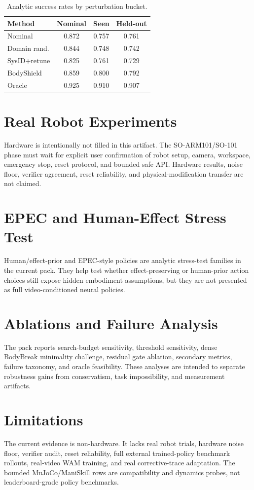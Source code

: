 \documentclass[10pt,conference]{IEEEtran}
\begin{document}
\begin{table}[t]
\caption{Analytic success rates by perturbation bucket.}
\label{tab:analytic-success}
\centering
\footnotesize
\begin{tabular}{lccc}
\toprule
Method & Nominal & Seen & Held-out \\
\midrule
Nominal & 0.872 & 0.757 & 0.761 \\
Domain rand. & 0.844 & 0.748 & 0.742 \\
SysID+retune & 0.825 & 0.761 & 0.729 \\
BodyShield & 0.859 & 0.800 & 0.792 \\
Oracle & 0.925 & 0.910 & 0.907 \\
\bottomrule
\end{tabular}
\end{table}

\section{Real Robot Experiments}
Hardware is intentionally not filled in this artifact. The SO-ARM101/SO-101 phase must wait for explicit user confirmation of robot setup, camera, workspace, emergency stop, reset protocol, and bounded safe API. Hardware results, noise floor, verifier agreement, reset reliability, and physical-modification transfer are not claimed.

\section{EPEC and Human-Effect Stress Test}
Human/effect-prior and EPEC-style policies are analytic stress-test families in the current pack. They help test whether effect-preserving or human-prior action choices still expose hidden embodiment assumptions, but they are not presented as full video-conditioned neural policies.

\section{Ablations and Failure Analysis}
The pack reports search-budget sensitivity, threshold sensitivity, dense BodyBreak minimality challenge, residual gate ablation, secondary metrics, failure taxonomy, and oracle feasibility. These analyses are intended to separate robustness gains from conservatism, task impossibility, and measurement artifacts.

\section{Limitations}
The current evidence is non-hardware. It lacks real robot trials, hardware noise floor, verifier audit, reset reliability, full external trained-policy benchmark rollouts, real-video WAM training, and real corrective-trace adaptation. The bounded MuJoCo/ManiSkill rows are compatibility and dynamics probes, not leaderboard-grade policy benchmarks.
\end{document}

